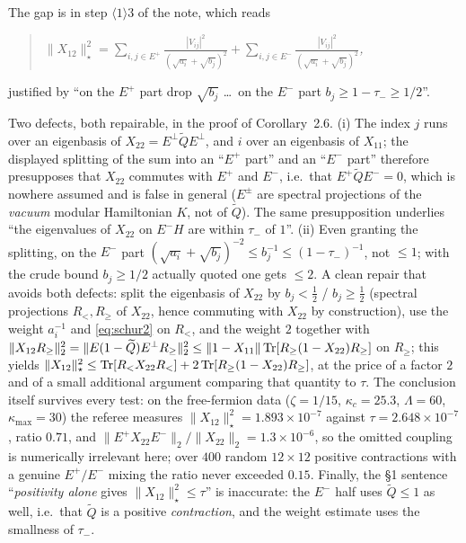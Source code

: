 \documentclass[11pt]{article}
\newcommand{\Nst}[1]{\lVert #1\rVert_{\star}}\newcommand{\Pinch}{\mathcal P}
\newcommand{\Qt}{\widetilde{Q}}\newcommand{\HS}{\mathfrak{S}_2}
\begin{document}
\noindent The gap is in step $\langle1\rangle3$ of the note, which reads
\begin{quote}\itshape
$\Nst{X_{12}}^2=\sum_{i,j\in E^+}\frac{|V_{ij}|^2}{(\sqrt{a_i}+\sqrt{b_j})^2}
+\sum_{i,j\in E^-}\frac{|V_{ij}|^2}{(\sqrt{a_i}+\sqrt{b_j})^2}$,
\end{quote}
justified by ``on the $E^+$ part drop $\sqrt{b_j}$ \ldots\ on the $E^-$ part $b_j\ge1-\tau_-\ge1/2$''.

\begin{verdictgap}
Two defects, both repairable, in the proof of Corollary~2.6.  (i) The index $j$ runs over an
eigenbasis of $X_{22}=E^\perp\Qt E^\perp$, and $i$ over an eigenbasis of $X_{11}$; the displayed
splitting of the sum into an ``$E^+$ part'' and an ``$E^-$ part'' therefore presupposes that
$X_{22}$ commutes with $E^+$ and $E^-$, i.e.\ that $E^+\Qt E^-=0$, which is nowhere assumed and is
false in general ($E^\pm$ are spectral projections of the \emph{vacuum} modular Hamiltonian $K$, not
of $\Qt$).  The same presupposition underlies ``the eigenvalues of $X_{22}$ on $E^-H$ are within
$\tau_-$ of $1$''.  (ii) Even granting the splitting, on the $E^-$ part
$(\sqrt{a_i}+\sqrt{b_j})^{-2}\le b_j^{-1}\le(1-\tau_-)^{-1}$, not $\le1$; with the crude bound
$b_j\ge1/2$ actually quoted one gets $\le2$.  A clean repair that avoids both defects: split the
eigenbasis of $X_{22}$ by $b_j<\frac12$ / $b_j\ge\frac12$ (spectral projections $R_<,R_\ge$ of
$X_{22}$, hence commuting with $X_{22}$ by construction), use the weight $a_i^{-1}$ and
\eqref{eq:schur2} on $R_<$, and the weight $2$ together with
$\|X_{12}R_\ge\|_2^2=\|E(1-\Qt)E^\perp R_\ge\|_2^2\le\|1-X_{11}\|\Tr[R_\ge(1-X_{22})R_\ge]$ on
$R_\ge$; this yields $\Nst{X_{12}}^2\le\Tr[R_<X_{22}R_<]+2\Tr[R_\ge(1-X_{22})R_\ge]$, at the price of
a factor $2$ and of a small additional argument comparing that quantity to $\tau$.  The conclusion
itself survives every test: on the free-fermion data ($\zeta=1/15$, $\kappa_c=25.3$,
$\Lambda=60$, $\kappa_{\max}=30$) the referee measures $\Nst{X_{12}}^2=1.893\times10^{-7}$ against
$\tau=2.648\times10^{-7}$, ratio $0.71$, and $\|E^+X_{22}E^-\|_2/\|X_{22}\|_2=1.3\times10^{-6}$, so
the omitted coupling is numerically irrelevant here; over $400$ random $12\times12$ positive
contractions with a genuine $E^+/E^-$ mixing the ratio never exceeded $0.15$.
Finally, the \S1 sentence ``\emph{positivity alone} gives $\Nst{X_{12}}^2\le\tau$'' is inaccurate:
the $E^-$ half uses $\Qt\le1$ as well, i.e.\ that $\Qt$ is a positive \emph{contraction}, and the
weight estimate uses the smallness of $\tau_-$.
\end{verdictgap}
\end{document}
